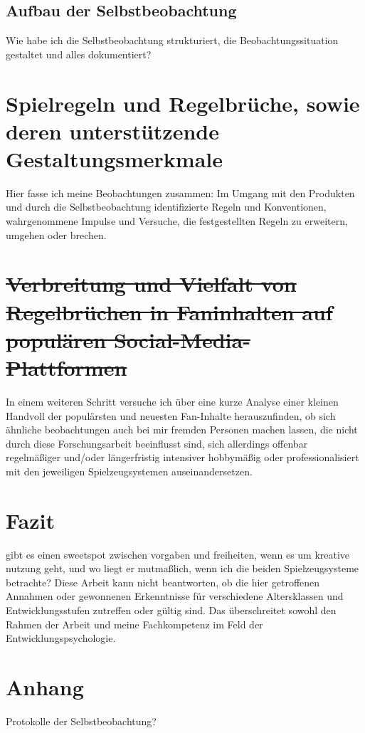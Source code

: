 \documentclass[11pt,a4paper,twoside]{scrreprt}
\begin{document}
	\section{Aufbau der Selbstbeobachtung}
Wie habe ich die Selbstbeobachtung strukturiert, die Beobachtungssituation gestaltet und alles dokumentiert?


\chapter{Spielregeln und Regelbrüche, sowie deren unterstützende Gestaltungsmerkmale}
Hier fasse ich meine Beobachtungen zusammen: Im Umgang mit den Produkten und durch die Selbstbeobachtung identifizierte Regeln und Konventionen, wahrgenommene Impulse und Versuche, die festgestellten Regeln zu erweitern, umgehen oder brechen.


\chapter{\sout{Verbreitung und Vielfalt von Regelbrüchen in Faninhalten auf populären Social-Media-Plattformen}}
In einem weiteren Schritt versuche ich über eine kurze Analyse einer kleinen Handvoll der populärsten und neuesten Fan-Inhalte herauszufinden, ob sich ähnliche beobachtungen auch bei mir fremden Personen machen lassen, die nicht durch diese Forschungsarbeit beeinflusst sind, sich allerdings offenbar regelmäßiger und/oder längerfristig intensiver hobbymäßig oder professionalisiert mit den jeweiligen Spielzeugsystemen auseinandersetzen.


\chapter{Fazit}
gibt es einen sweetspot zwischen vorgaben und freiheiten, wenn es um kreative nutzung geht, und wo liegt er mutmaßlich, wenn ich die beiden Spielzeugsysteme betrachte? Diese Arbeit kann nicht beantworten, ob die hier getroffenen Annahmen oder gewonnenen Erkenntnisse für verschiedene Altersklassen und Entwicklungsstufen zutreffen oder gültig sind. Das überschreitet sowohl den Rahmen der Arbeit und meine Fachkompetenz im Feld der Entwicklungspsychologie.

\chapter{Anhang}
Protokolle der Selbstbeobachtung? 

\fi
\end{document}
